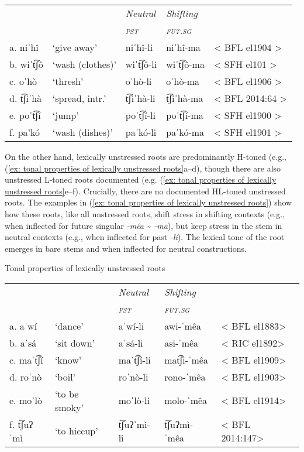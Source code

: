 \begin{tabular}{lllll}
& & \textit{Neutral} & \textit{Shifting}\\
      & & \textit{\textsc{pst}} & \textit{\textsc{fut.sg}}\\
     a. { niˈhî}&{`give away'} & {niˈhî-li } & {niˈhî-ma } & {< BFL el1904 >}\\
     b. { wiˈt͡ʃô}&{`wash (clothes)'} & {wiˈt͡ʃô-li} & {wiˈt͡ʃô-ma } & {< SFH el101 >}\\
     c. { oˈhò}& {`thresh'} & {oˈhò-li } & {oˈhò-ma} & {< BFL el1906 >}\\
     d. { t͡ʃiˈhà}& {`spread, intr.'} & {t͡ʃiˈhà-li}&{t͡ʃiˈhà-ma } & {< BFL 2014:64 >}\\
     e. { poˈt͡ʃí}& {`jump'} & {poˈt͡ʃí-li } & {poˈt͡ʃí-ma} & {< SFH el1900 >}\\
     f. { pa'kó}& {`wash (dishes)'} & {paˈkó-li} & {paˈkó-ma} & {< SFH el1901 >}\\
\end{tabular}

    \z

On the other hand, lexically unstressed roots are predominantly H-toned (e.g., (\ref{ex: tonal properties of lexically unstressed roots}a--d), though there are also unstressed L-toned roots documented (e.g. (\ref{ex: tonal properties of lexically unstressed roots}e--f). Crucially, there are no documented HL-toned unstressed roots. The examples in (\ref{ex: tonal properties of lexically unstressed roots}) show how these roots, like all unstressed roots, shift stress in shifting contexts (e.g., when inflected for future singular \textit{-mêa} {\textasciitilde} \textit{-ma}), but keep stress in the stem in neutral contexts (e.g., when inflected for past \textit{-li}). The lexical tone of the root emerges in bare stems and when inflected for neutral constructions.

\ea\label{ex: tonal properties of lexically unstressed roots}
{Tonal properties of lexically unstressed roots}

\begin{tabular}{lllll}
        & & \textit{Neutral} & \textit{Shifting}\\
       & &\textit{\textsc{pst}} & \textit{\textsc{fut.sg}}\\
     a. {aˈwí} & {`dance'} & aˈwí-li  & {awi-ˈmêa } & {< BFL el1883>}  \\
     b. {aˈsá} &{`sit down'} & {aˈsá-li } & {asi-ˈmêa } & {< RIC el1892>}\\
     c. {maˈt͡ʃí}& {`know'} & {maˈt͡ʃí-li } & {mat͡ʃi-ˈmêa} & {< BFL el1909>}\\
     d. {roˈnò} &{`boil'} & {roˈnò-li } & {rono-ˈmêa } & {< BFL el1903>}\\
     e. {moˈlò}& {`to be smoky'} & {moˈlò-li } & {molo-ˈmêa } & {< BFL el1914>}\\
     f. {t͡ʃuʔˈmì}& {`to hiccup'} & {t͡ʃuʔˈmì-li } & {t͡ʃuʔmì-ˈmêa} & {< BFL 2014:147>}\\
\end{tabular}

